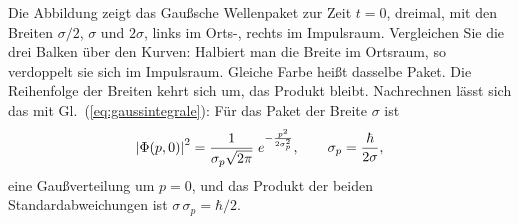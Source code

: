 


Die Abbildung zeigt das Gaußsche Wellenpaket zur Zeit $t=0$, dreimal, mit den Breiten $\sigma/2$, $\sigma$ und $2\sigma$, links im Orts-, rechts im Impulsraum. Vergleichen Sie die drei Balken über den Kurven: Halbiert man die Breite im Ortsraum, so verdoppelt sie sich im Impulsraum. Gleiche Farbe heißt dasselbe Paket. Die Reihenfolge der Breiten kehrt sich um, das Produkt bleibt. Nachrechnen lässt sich das mit Gl.~(\ref{eq:gaussintegrale}): Für das Paket der Breite $\sigma$ ist
\begin{equation}
	\left\lvert \Phi(p,0) \right\rvert^2 = \frac{1}{\sigma_p\sqrt{2\pi}}\;e^{-\frac{p^2}{2\sigma_p^2}}, \qquad \sigma_p = \frac{\hbar}{2\sigma},
\end{equation}
eine Gaußverteilung um $p = 0$, und das Produkt der beiden Standardabweichungen ist $\sigma\,\sigma_p = \hbar/2$.

